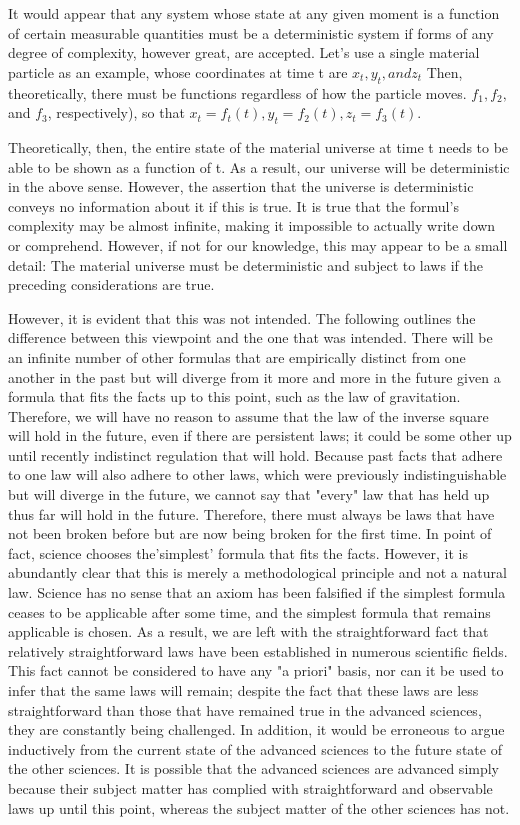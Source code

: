 \documentclass[a4paper,12pt]{book}[2004/02/16]
\theoremstyle{ilemma}
\theoremstyle{itheorem}
\theoremstyle{iother}
\theoremstyle{icorollary}
\theoremstyle{numcorollary}
\theoremstyle{idefinition}
\begin{document}
It would appear that any system whose state at any given moment is a function of certain measurable quantities must be a deterministic system if forms of any degree of complexity, however great, are accepted. Let's use a single material particle as an example, whose coordinates at time t are  $x_t, y_t, and z_t$ Then, theoretically, there must be functions regardless of how the particle moves. $f_1, f_2,$ and $ f_3$, respectively), so that $x_{t} = f_{t}(t), y_{t} = f_{2}(t), z_{t} = f_{3}(t).$

Theoretically, then, the entire state of the material universe at time t needs to be able to be shown as a function of t. As a result, our universe will be deterministic in the above sense. However, the assertion that the universe is deterministic conveys no information about it if this is true. It is true that the formul's complexity may be almost infinite, making it impossible to actually write down or comprehend. However, if not for our knowledge, this may appear to be a small detail: The material universe must be deterministic and subject to laws if the preceding considerations are true.

However, it is evident that this was not intended. The following outlines the difference between this viewpoint and the one that was intended. There will be an infinite number of other formulas that are empirically distinct from one another in the past but will diverge from it more and more in the future given a formula that fits the facts up to this point, such as the law of gravitation. Therefore, we will have no reason to assume that the law of the inverse square will hold in the future, even if there are persistent laws; it could be some other up until recently
indistinct regulation that will hold. Because past facts that adhere to one law will also adhere to other laws, which were previously indistinguishable but will diverge in the future, we cannot say that "every" law that has held up thus far will hold in the future. Therefore, there must always be laws that have not been broken before but are now being broken for the first time. In point of fact, science chooses the'simplest' formula that fits the facts. However, it is abundantly clear that this is merely a methodological principle and not a natural law. Science has no sense that an axiom has been falsified if the simplest formula ceases to be applicable after some time, and the simplest formula that remains applicable is chosen. As a result, we are left with the straightforward fact that relatively straightforward laws have been established in numerous scientific fields. This fact cannot be considered to have any "a priori" basis, nor can it be used to infer that the same laws will remain; despite the fact that these laws are less straightforward than those that have remained true in the advanced sciences, they are constantly being challenged. In addition, it would be erroneous to argue inductively from the current state of the advanced sciences to the future state of the other sciences. It is possible that the advanced sciences are advanced simply because their subject matter has complied with straightforward and observable laws up until this point, whereas the subject matter of the other sciences has not.
\end{document}
